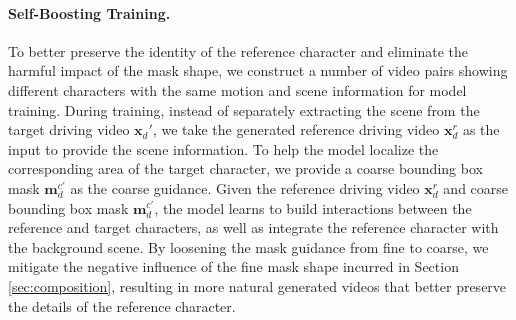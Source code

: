 





\paragraph{Self-Boosting Training.}

To better preserve the identity of the reference character and eliminate the harmful impact of the mask shape, we construct a number of video pairs showing different characters with the same motion and scene information for model training.
During training, instead of separately extracting the scene from the target driving video $\boldsymbol{x}_d'$, we take the generated reference driving video $\boldsymbol{x}_d^r$ as the input to provide the scene information.
To help the model localize the corresponding area of the target character, we provide a coarse bounding box mask $\boldsymbol{m}_d^{c\prime}$ as the coarse guidance.
Given the reference driving video $\boldsymbol{x}_d^r$ and coarse bounding box mask $\boldsymbol{m}_d^{c\prime}$, the model learns to build interactions between the reference and target characters, as well as integrate the reference character with the background scene.
By loosening the mask guidance from fine to coarse, we mitigate the negative influence of the fine mask shape incurred in Section \ref{sec:composition}, resulting in more natural generated videos that better preserve the details of the reference character.
















